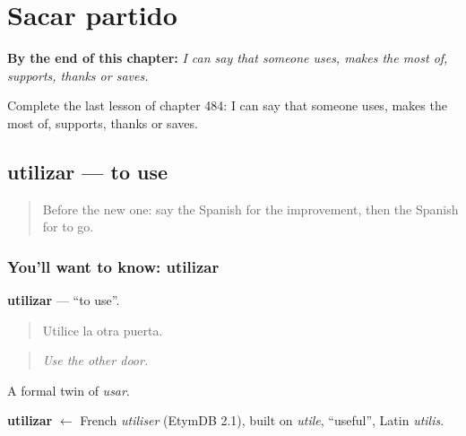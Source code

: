 
\chapter{Sacar partido}
\label{ch:es-sacar-partido}

\begin{chapteropening}
\textbf{By the end of this chapter:} \emph{I can say that someone uses, makes the most of, supports, thanks or saves.}

Complete the last lesson of chapter 484: I can say that someone uses, makes the most of, supports, thanks or saves.
\end{chapteropening}

\section[utilizar]{utilizar — to use}

\label{lesson:ES-C484-utilizar}



\begin{quote}
Before the new one: say the Spanish for the improvement, then the Spanish for to go.
\end{quote}

\subsection*{You'll want to know: utilizar}
\textbf{utilizar} — \textquotedblleft{}to use\textquotedblright{}.

\begin{quote}
Utilice la otra puerta.
\end{quote}

\begin{quote}
\emph{Use the other door.}
\end{quote}

A formal twin of \emph{usar}.

\begin{cousinweb}
\textbf{utilizar} $\leftarrow$ French \emph{utiliser} (EtymDB 2.1), built on \emph{utile}, \textquotedblleft{}useful\textquotedblright{}, Latin \emph{utilis}.
\end{cousinweb}

